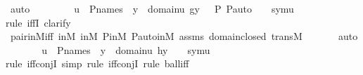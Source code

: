 \begin{isabellebody}
\ auto\ \isanewline
\ \ \isamarkupfalse%
\ \isamarkupfalse%
\ {\isachardoublequoteopen}{\isachardot}{\kern0pt}{\isachardot}{\kern0pt}{\isachardot}{\kern0pt}\ {\isasymlongleftrightarrow}\ u\ {\isasymin}\ P{\isacharunderscore}{\kern0pt}names\ {\isasymand}\ {\isacharparenleft}{\kern0pt}{\isasymforall}y\ {\isasymin}\ domain{\isacharparenleft}{\kern0pt}u{\isacharparenright}{\kern0pt}{\isachardot}{\kern0pt}\ g{\isacharbackquote}{\kern0pt}{\isasymlangle}y{\isacharcomma}{\kern0pt}\ {\isasymF}{\isacharcomma}{\kern0pt}\ {\isasymG}{\isacharcomma}{\kern0pt}\ P{\isacharcomma}{\kern0pt}\ P{\isacharunderscore}{\kern0pt}auto{\isasymrangle}\ {\isacharequal}{\kern0pt}\ {}{\isacharparenright}{\kern0pt}\ {\isasymand}\ sym{\isacharparenleft}{\kern0pt}u{\isacharparenright}{\kern0pt}\ {\isasymin}\ {\isasymF}{\isachardoublequoteclose}\ \isanewline
\ \ \ \ \isamarkupfalse%
{\isacharparenleft}{\kern0pt}rule\ iffI{\isacharcomma}{\kern0pt}\ clarify{\isacharparenright}{\kern0pt}\isanewline
\ \ \ \ \isamarkupfalse%
\ pair{\isacharunderscore}{\kern0pt}in{\isacharunderscore}{\kern0pt}M{\isacharunderscore}{\kern0pt}iff\ {\isasymF}{\isacharunderscore}{\kern0pt}in{\isacharunderscore}{\kern0pt}M\ {\isasymG}{\isacharunderscore}{\kern0pt}in{\isacharunderscore}{\kern0pt}M\ P{\isacharunderscore}{\kern0pt}in{\isacharunderscore}{\kern0pt}M\ P{\isacharunderscore}{\kern0pt}auto{\isacharunderscore}{\kern0pt}in{\isacharunderscore}{\kern0pt}M\ assms\ domain{\isacharunderscore}{\kern0pt}closed\ transM\ \isanewline
\ \ \ \ \isamarkupfalse%
\ auto\isanewline
\ \ \isamarkupfalse%
\ \isamarkupfalse%
\ {\isachardoublequoteopen}{\isachardot}{\kern0pt}{\isachardot}{\kern0pt}{\isachardot}{\kern0pt}\ {\isasymlongleftrightarrow}\ u\ {\isasymin}\ P{\isacharunderscore}{\kern0pt}names\ {\isasymand}\ {\isacharparenleft}{\kern0pt}{\isasymforall}y\ {\isasymin}\ domain{\isacharparenleft}{\kern0pt}u{\isacharparenright}{\kern0pt}{\isachardot}{\kern0pt}\ h{\isacharbackquote}{\kern0pt}y\ {\isacharequal}{\kern0pt}\ {}{\isacharparenright}{\kern0pt}\ {\isasymand}\ sym{\isacharparenleft}{\kern0pt}u{\isacharparenright}{\kern0pt}\ {\isasymin}\ {\isasymF}{\isachardoublequoteclose}\ \isanewline
\ \ \ \ \isamarkupfalse%
{\isacharparenleft}{\kern0pt}rule\ iff{\isacharunderscore}{\kern0pt}conjI{\isacharcomma}{\kern0pt}\ simp{\isacharcomma}{\kern0pt}\ rule\ iff{\isacharunderscore}{\kern0pt}conjI{\isacharcomma}{\kern0pt}\ rule\ ball{\isacharunderscore}{\kern0pt}iff{\isacharparenright}{\kern0pt}\isanewline

\end{isabellebody}
